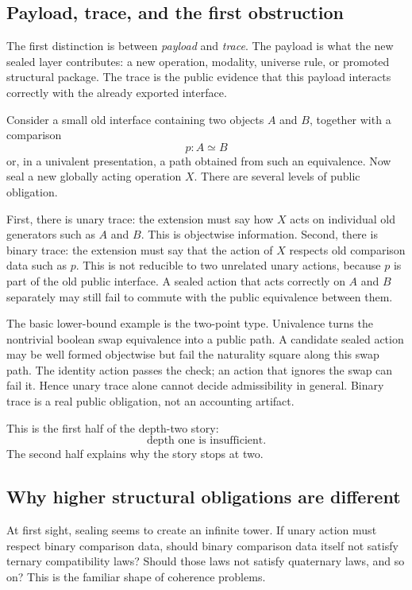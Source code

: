 \subsection{Payload, trace, and the first obstruction}

The first distinction is between \emph{payload} and \emph{trace}.  The payload is
what the new sealed layer contributes: a new operation, modality, universe rule,
or promoted structural package.  The trace is the public evidence that this
payload interacts correctly with the already exported interface.

Consider a small old interface containing two objects \(A\) and \(B\), together
with a comparison
\[
  p : A \simeq B
\]
or, in a univalent presentation, a path obtained from such an equivalence.  Now
seal a new globally acting operation \(X\).  There are several levels of public
obligation.

First, there is unary trace: the extension must say how \(X\) acts on individual
old generators such as \(A\) and \(B\).  This is objectwise information.  Second,
there is binary trace: the extension must say that the action of \(X\) respects
old comparison data such as \(p\).  This is not reducible to two unrelated unary
actions, because \(p\) is part of the old public interface.  A sealed action that
acts correctly on \(A\) and \(B\) separately may still fail to commute with the
public equivalence between them.

The basic lower-bound example is the two-point type.  Univalence turns the
nontrivial boolean swap equivalence into a public path.  A candidate sealed
action may be well formed objectwise but fail the naturality square along this
swap path.  The identity action passes the check; an action that ignores the
swap can fail it.  Hence unary trace alone cannot decide admissibility in
general.  Binary trace is a real public obligation, not an accounting artifact.

This is the first half of the depth-two story:
\[
  \text{depth one is insufficient.}
\]
The second half explains why the story stops at two.

\subsection{Why higher structural obligations are different}

At first sight, sealing seems to create an infinite tower.  If unary action must
respect binary comparison data, should binary comparison data itself not satisfy
ternary compatibility laws?  Should those laws not satisfy quaternary laws, and
so on?  This is the familiar shape of coherence problems.

